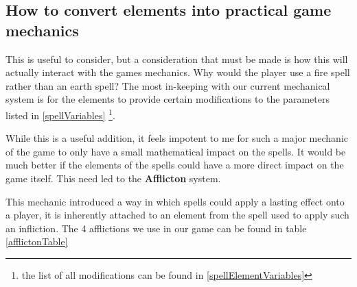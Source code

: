 \documentclass[12pt,a4paper]{report}
\begin{document}
\subsection{How to convert elements into practical game mechanics} \label{afflictions}

This is useful to consider, but a consideration that must be made is how this will actually interact with the games mechanics. Why would the player use a fire spell rather than an earth spell? The most in-keeping with our current mechanical system is for the elements to provide certain modifications to the parameters listed in \ref{spellVariables} \footnote{the list of all modifications can be found in \ref{spellElementVariables}}.

While this is a useful addition, it feels impotent to me for such a major mechanic of the game to only have a small mathematical impact on the spells. It would be much better if the elements of the spells could have a more direct impact on the game itself. This need led to the \textbf{Afflicton} system.

This mechanic introduced a way in which spells could apply a lasting effect onto a player, it is inherently attached to an element from the spell used to apply such an infliction. The 4 afflictions we use in our game can be found in table \ref{afflictonTable}
\end{document}
